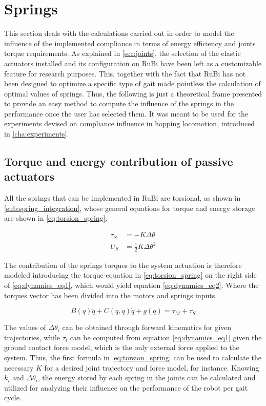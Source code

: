 
\section{Springs}
\label{sec_springs}
This section deals with the calculations carried out in order to model the influence of the implemented compliance in terms of energy efficiency and joints torque requirements.
As explained in \ref{sec:joints}, the selection of the elastic actuators installed and its configuration on RuBi have been left as a customizable feature for research purposes.
This, together with the fact that RuBi has not been designed to optimize a specific type of gait made pointless the calculation of optimal values of springs.
Thus, the following is just a theoretical frame presented to provide an easy method to compute the influence of the springs in the performance once the user has selected them.
It was meant to be used for the experiments devised on compliance influence in hopping locomotion, introduced in \ref{cha:experiments}.

\subsection{Torque and energy contribution of passive actuators} %
\label{sub:torque_contribution_of_passive_actuators}
All the springs that can be implemented in RuBi are torsional, as shown in \ref{sub:spring_integration}, whose general equations for torque and energy storage are shown in \ref{eq:torsion_spring}. 

\begin{equation}
\label{eq:torsion_spring}
\begin{aligned}
	\tau_{S} &= -K \Delta \theta \\
	U_{S} &= \frac{1}{2}K \Delta \theta^2
\end{aligned}
\end{equation}

The contribution of the springs torques to the system actuation is therefore modeled introducing the torque equation in \ref{eq:torsion_spring} on the right side of \ref{eq:dynamics_eq1}, which would yield equation \ref{eq:dynamics_eq2}.
Where the torques vector has been divided into the motors and springs inputs.

\begin{equation}
	\label{eq:dynamics_eq2}
	B(q)\ddot{q} + C(q,\dot{q})\dot{q} + g(q) = \tau_{M} + \tau_{S}
\end{equation}

The values of $\Delta \theta_{i}$ can be obtained through forward kinematics for given trajectories, while $\tau_{i}$ can be computed from equation \ref{eq:dynamics_eq1} given the ground contact force model, which is the only external force applied to the system.
Thus, the first formula in \ref{eq:torsion_spring} can be used to calculate the necessary $K$ for a desired joint trajectory and force model, for instance.
Knowing $k_{i}$ and $\Delta \theta_{i}$, the energy stored by each spring in the joints can be calculated and utilized for analyzing their influence on the performance of the robot per gait cycle.


